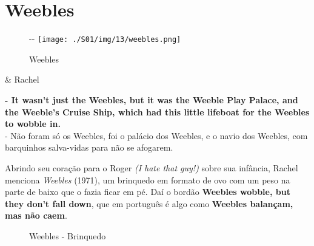 \hypertarget{weebles}{%
\section{Weebles}\label{weebles}}

\begin{figure}[!ht]
  \begin{adjustwidth}{-\oddsidemargin-1in}{-\rightmargin}
    \centering
    \texttt{[image: ./S01/img/13/weebles.png]}
    \caption{Weebles\label{fig:weebles}}
  \end{adjustwidth}
\end{figure}

\begin{tcolorbox}[enhanced,center upper,
    drop fuzzy shadow southeast, boxrule=0.3pt,
    lower separated=false,
    colframe=black!30!dialogoBorder,colback=white]
\begin{minipage}[c]{0.16\linewidth}
   & \centering \scriptsize{Rachel}
\end{minipage}
\hfill
\begin{minipage}[c]{0.8\linewidth}
  \textbf{- It wasn't just the Weebles, but it was the Weeble Play Palace, and the Weeble's Cruise Ship, which had this little lifeboat for the Weebles to wobble in.}\\
  - Não foram só os Weebles, foi o palácio dos Weebles, e o navio dos Weebles, com barquinhos salva-vidas para não se afogarem.
\end{minipage}
\end{tcolorbox}

Abrindo seu coração para o Roger \emph{(I hate that guy!)} sobre sua
infância, Rachel menciona \emph{Weebles} (1971), um brinquedo em formato
de ovo com um peso na parte de baixo que o fazia ficar em pé. Daí o
bordão \textbf{Weebles wobble, but they don't fall down}, que em
português é algo como \textbf{Weebles balançam, mas não caem}.

\begin{figure}
  \centering
    \caption{Weebles - Brinquedo\label{fig:weebles-brinquedo}}
\end{figure}

